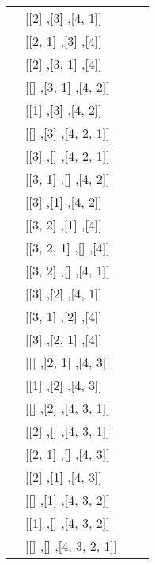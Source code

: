 \begin{table}[h]
\begin{tabular}{|l|l|l|l|}
                & [[2] ,[3] ,[4, 1]]     & &                                              \\
                & [[2, 1] ,[3] ,[4]]     & &                                              \\
                & [[2] ,[3, 1] ,[4]]     & &                                              \\
                & [[] ,[3, 1] ,[4, 2]]   & &                                              \\
                & [[1] ,[3] ,[4, 2]]     & &                                              \\
                & [[] ,[3] ,[4, 2, 1]]   & &                                              \\
                & [[3] ,[] ,[4, 2, 1]]   & &                                              \\
                & [[3, 1] ,[] ,[4, 2]]   & &                                              \\
                & [[3] ,[1] ,[4, 2]]     & &                                              \\
                & [[3, 2] ,[1] ,[4]]     & &                                              \\
                & [[3, 2, 1] ,[] ,[4]]   & &                                              \\
                & [[3, 2] ,[] ,[4, 1]]   & &                                              \\
                & [[3] ,[2] ,[4, 1]]     & &                                              \\
                & [[3, 1] ,[2] ,[4]]     & &                                              \\
                & [[3] ,[2, 1] ,[4]]     & &                                              \\
                & [[] ,[2, 1] ,[4, 3]]   & &                                              \\
                & [[1] ,[2] ,[4, 3]]     & &                                              \\
                & [[] ,[2] ,[4, 3, 1]]   & &                                              \\
                & [[2] ,[] ,[4, 3, 1]]   & &                                              \\
                & [[2, 1] ,[] ,[4, 3]]   & &                                              \\
                & [[2] ,[1] ,[4, 3]]     & &                                              \\
                & [[] ,[1] ,[4, 3, 2]]   & &                                              \\
                & [[1] ,[] ,[4, 3, 2]]   & &                                              \\
                & [[] ,[] ,[4, 3, 2, 1]] & &                                              \\
\hline


\end{tabular}
\end{table}
